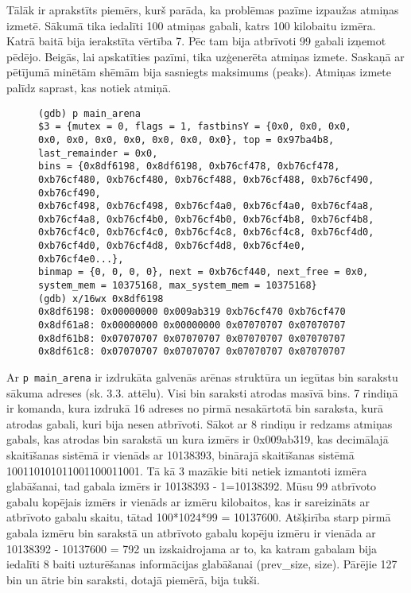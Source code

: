 Tālāk ir aprakstīts piemērs, kurš parāda, ka problēmas pazīme izpaužas atmiņas izmetē. 
Sākumā tika iedalīti 100 atmiņas gabali, katrs 100 kilobaitu izmēra.
Katrā baitā bija ierakstīta vērtība 7.
Pēc tam bija atbrīvoti 99 gabali izņemot pēdējo.
Beigās, lai apskatīties pazīmi, tika uzģenerēta atmiņas izmete.
Saskaņā ar pētījumā minētām shēmām \cite{PWMS}  bija sasniegts maksimums (peaks). 
Atmiņas izmete palīdz saprast, kas notiek atmiņā.
\begin{figure}[h]
\begin{lstlisting}[style=customgdb]
(gdb) p main_arena
$3 = {mutex = 0, flags = 1, fastbinsY = {0x0, 0x0, 0x0, 0x0, 0x0, 0x0, 0x0, 0x0, 0x0, 0x0}, top = 0x97ba4b8, last_remainder = 0x0,
bins = {0x8df6198, 0x8df6198, 0xb76cf478, 0xb76cf478, 0xb76cf480, 0xb76cf480, 0xb76cf488, 0xb76cf488, 0xb76cf490, 0xb76cf490,
0xb76cf498, 0xb76cf498, 0xb76cf4a0, 0xb76cf4a0, 0xb76cf4a8, 0xb76cf4a8, 0xb76cf4b0, 0xb76cf4b0, 0xb76cf4b8, 0xb76cf4b8,
0xb76cf4c0, 0xb76cf4c0, 0xb76cf4c8, 0xb76cf4c8, 0xb76cf4d0, 0xb76cf4d0, 0xb76cf4d8, 0xb76cf4d8, 0xb76cf4e0, 0xb76cf4e0...},
binmap = {0, 0, 0, 0}, next = 0xb76cf440, next_free = 0x0, system_mem = 10375168, max_system_mem = 10375168}
(gdb) x/16wx 0x8df6198
0x8df6198: 0x00000000 0x009ab319 0xb76cf470 0xb76cf470
0x8df61a8: 0x00000000 0x00000000 0x07070707 0x07070707
0x8df61b8: 0x07070707 0x07070707 0x07070707 0x07070707
0x8df61c8: 0x07070707 0x07070707 0x07070707 0x07070707
\end{lstlisting}
\caption{\textbf{\fontsize{11}{12}\selectfont {bin saraksta izdruka, izmantojot atmiņas izmeti}}}
\end{figure}
Ar \texttt{p main\_arena} ir izdrukāta galvenās arēnas struktūra un iegūtas bin sarakstu sākuma adreses (sk. 3.3. attēlu). 
Visi bin saraksti atrodas masīvā bins.
7 rindiņā ir komanda, kura izdrukā 16 adreses no pirmā nesakārtotā bin saraksta, kurā atrodas gabali, kuri bija nesen atbrīvoti.
Sākot ar 8 rindiņu ir redzams atmiņas gabals, kas atrodas bin sarakstā un kura izmērs ir 0x009ab319, kas decimālajā skaitīšanas sistēmā ir vienāds ar 10138393, binārajā skaitīšanas sistēmā 100110101011001100011001.
Tā kā 3 mazākie biti netiek izmantoti izmēra glabāšanai, tad gabala izmērs ir 10138393 - 1=10138392.
Mūsu 99 atbrīvoto gabalu kopējais izmērs ir vienāds ar izmēru kilobaitos, kas ir sareizināts ar atbrīvoto gabalu skaitu, tātad 100*1024*99 = 10137600.
Atšķirība starp pirmā gabala izmēru bin sarakstā un atbrīvoto gabalu kopēju izmēru ir vienāda ar 10138392 - 10137600 = 792 un izskaidrojama ar to, ka katram gabalam bija iedalīti 8 baiti uzturēšanas informācijas glabāšanai (prev\_size, size).
Pārējie 127 bin un ātrie bin saraksti, dotajā piemērā, bija tukši.

